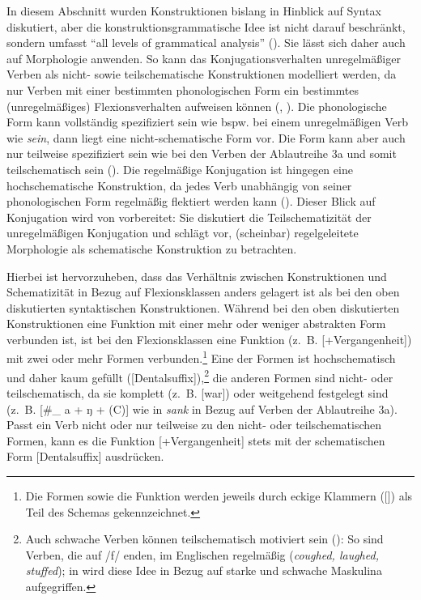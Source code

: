 In diesem Abschnitt wurden Konstruktionen bislang in Hinblick auf Syntax diskutiert, aber die konstruktionsgrammatische Idee ist nicht darauf beschränkt, sondern umfasst "`all levels of grammatical analysis"' (\cite[5]{Goldberg.2006}). Sie lässt sich daher auch auf Morphologie anwenden. So kann das Konjugationsverhalten unregelmäßiger Verben als nicht- sowie teilschematische Konstruktionen modelliert werden, da nur Verben mit einer bestimmten phonologischen Form ein bestimmtes (unregelmäßiges) Flexionsverhalten aufweisen können (\cite{Bybee.1982, Bybee.1983}, \cite[66--69]{Bybee.2010}). Die phonologische Form kann vollständig spezifiziert sein wie bspw. bei einem unregelmäßigen Verb wie \textit{sein}, dann liegt eine nicht-schematische Form vor. Die Form kann aber auch nur teilweise spezifiziert sein wie bei den Verben der Ablautreihe 3a und somit teilschematisch sein (\cite[450]{Bucker.2015}). Die regelmäßige Konjugation ist hingegen eine hochschematische Konstruk\-tion, da jedes Verb unabhängig von seiner phonologischen Form regelmäßig flektiert werden kann (\cite[67]{Bybee.2010}). Dieser Blick auf Konjugation wird von \textcite[86]{Bybee.1991} vorbereitet: Sie diskutiert die Teilschematizität der unregelmäßigen Konjugation und schlägt vor, (scheinbar) regelgeleitete Morphologie als schematische Konstruktion zu betrachten. 



Hierbei ist hervorzuheben, dass das Verhältnis zwischen Konstruktionen und Schematizität in Bezug auf Flexionsklassen anders gelagert ist als bei den oben diskutierten syntaktischen Konstruktionen. Während bei den oben diskutierten Konstruktionen eine Funktion mit einer mehr oder weniger abstrakten Form verbunden ist, ist bei den Flexionsklassen eine Funktion (z.~B. [+Ver\-gangenheit]) mit zwei oder mehr Formen verbunden.\footnote{Die Formen sowie die Funktion werden jeweils durch eckige Klammern ([]) als Teil des Schemas gekennzeichnet.} Eine der Formen ist hochschematisch und daher kaum gefüllt ([Dentalsuffix]),\footnote{Auch schwache Verben können teilschematisch motiviert sein (\cite[135]{Goldberg.2019}): So sind Verben, die auf /f/ enden, im Englischen regelmäßig (\textit{coughed, laughed, stuffed}); in  wird diese Idee in Bezug auf starke und schwache Maskulina aufgegriffen.} die anderen Formen sind nicht- oder teilschematisch, da sie komplett (z.~B. [war]) oder weitgehend festgelegt sind (z.~B. [\#\_ a + ŋ + (C)]  wie in \textit{sank} in Bezug auf Verben der Ablautreihe 3a). Passt ein Verb nicht oder nur teilweise zu den nicht- oder teilschematischen Formen, kann es die Funktion [+Vergangenheit] stets mit der schematischen Form [Dentalsuffix] ausdrücken. 



